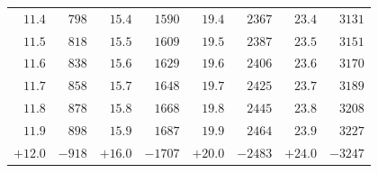 \begin{center}
{{\begin{minipage}[t][500pt][t]{.96\linewidth}
{\begin{tabular}{r|r||r|r||r|r||r|r}
$11.4$ & $798$ & $15.4$ & $1590$ & $19.4$ & $2367$ & $23.4$ & $3131$\\
$11.5$ & $818$ & $15.5$ & $1609$ & $19.5$ & $2387$ & $23.5$ & $3151$\\
$11.6$ & $838$ & $15.6$ & $1629$ & $19.6$ & $2406$ & $23.6$ & $3170$\\
$11.7$ & $858$ & $15.7$ & $1648$ & $19.7$ & $2425$ & $23.7$ & $3189$\\
$11.8$ & $878$ & $15.8$ & $1668$ & $19.8$ & $2445$ & $23.8$ & $3208$\\
$11.9$ & $898$ & $15.9$ & $1687$ & $19.9$ & $2464$ & $23.9$ & $3227$\\[4pt]
$+12.0$ & $-918$ & $+16.0$ & $-1707$ & $+20.0$ & $-2483$ & $+24.0$ & $-3247$
\end{tabular}}
\end{minipage}}}\endgroup
\end{center}
\clearpage{}%
